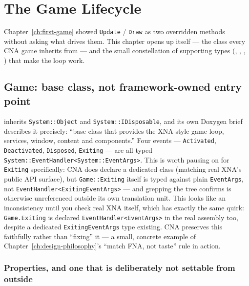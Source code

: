 \chapter{The Game Lifecycle}
\label{ch:game-lifecycle}
\label{ch:game-loop}

Chapter~\ref{ch:first-game} showed \texttt{Update} / \texttt{Draw} as two overridden methods
without asking what drives them. This chapter opens up  itself --- the class
every CNA game inherits from --- and the small constellation of supporting types
(, , ,
) that make the loop work.



\section{Game: base class, not framework-owned entry point}

 inherits \texttt{System::Object} and \texttt{System::IDisposable}, and its
own Doxygen brief describes it precisely: ``base class that provides the XNA-style game
loop, services, window, content and components.'' Four events --- \texttt{Activated},
\texttt{Deactivated}, \texttt{Disposed}, \texttt{Exiting} --- are all typed
\texttt{System::EventHandler<System::EventArgs>}. This is worth pausing on for
\texttt{Exiting} specifically: CNA does declare a dedicated  class
(matching real XNA's public API surface), but \texttt{Game::Exiting} itself is typed against
plain \texttt{EventArgs}, not \texttt{EventHandler<ExitingEventArgs>} --- and grepping the
tree confirms  is otherwise unreferenced outside its own
translation unit. This looks like an inconsistency until you check real XNA itself, which
has exactly the same quirk: \texttt{Game.Exiting} is declared \texttt{EventHandler<EventArgs>}
in the real assembly too, despite a dedicated \texttt{ExitingEventArgs} type existing.
CNA preserves this faithfully rather than ``fixing'' it --- a small, concrete example of
Chapter~\ref{ch:design-philosophy}'s ``match FNA, not taste'' rule in action.

\subsection{Properties, and one that is deliberately not settable from outside}

